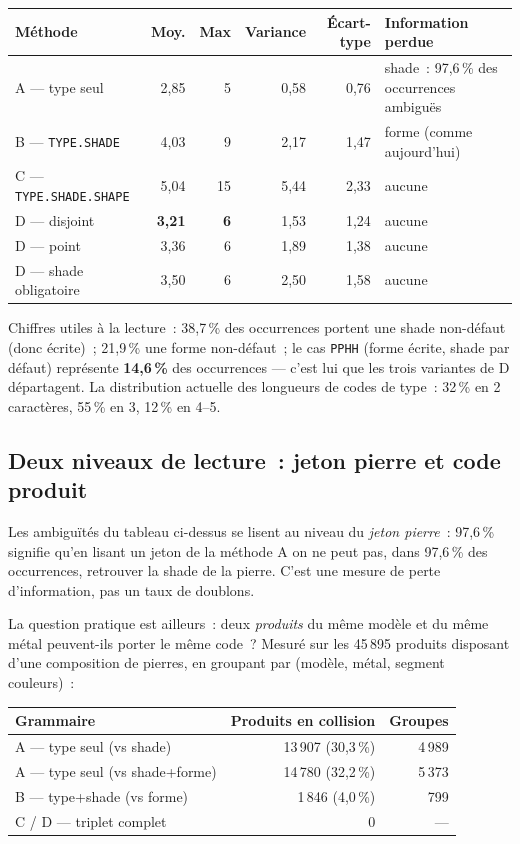 \documentclass[11pt,a4paper]{article}
\newcommand{\code}[1]{\texttt{#1}}
\begin{document}
\begin{center}
\begin{tabular}{l r r r r l}
\toprule
Méthode & Moy. & Max & Variance & Écart-type & Information perdue \\
\midrule
A — type seul            & 2,85 &  5 & 0,58 & 0,76 & shade~: 97,6\,\% des occurrences ambiguës \\
B — \code{TYPE.SHADE}    & 4,03 &  9 & 2,17 & 1,47 & forme (comme aujourd'hui) \\
C — \code{TYPE.SHADE.SHAPE} & 5,04 & 15 & 5,44 & 2,33 & aucune \\
D — disjoint             & \textbf{3,21} & \textbf{6} & 1,53 & 1,24 & aucune \\
D — point                & 3,36 &  6 & 1,89 & 1,38 & aucune \\
D — shade obligatoire    & 3,50 &  6 & 2,50 & 1,58 & aucune \\
\bottomrule
\end{tabular}
\end{center}

Chiffres utiles à la lecture~:
38,7\,\% des occurrences portent une shade non-défaut (donc écrite)~;
21,9\,\% une forme non-défaut~;
le cas \code{PPHH} (forme écrite, shade par défaut) représente
\textbf{14,6\,\%} des occurrences — c'est lui que les trois variantes de D
départagent. La distribution actuelle des longueurs de codes de type~:
32\,\% en 2 caractères, 55\,\% en 3, 12\,\% en 4--5.

\subsection{Deux niveaux de lecture~: jeton pierre et code produit}

Les ambiguïtés du tableau ci-dessus se lisent au niveau du \emph{jeton
pierre}~: 97,6\,\% signifie qu'en lisant un jeton de la méthode A on ne
peut pas, dans 97,6\,\% des occurrences, retrouver la shade de la pierre.
C'est une mesure de perte d'information, pas un taux de doublons.

La question pratique est ailleurs~: deux \emph{produits} du même modèle et
du même métal peuvent-ils porter le même code~? Mesuré sur les
45\,895 produits disposant d'une composition de pierres, en groupant par
(modèle, métal, segment couleurs)~:

\begin{center}
\begin{tabular}{l r r}
\toprule
Grammaire & Produits en collision & Groupes \\
\midrule
A — type seul (vs shade)         & 13\,907 (30,3\,\%) & 4\,989 \\
A — type seul (vs shade+forme)   & 14\,780 (32,2\,\%) & 5\,373 \\
B — type+shade (vs forme)        &  1\,846 (4,0\,\%)  &   799 \\
C / D — triplet complet          & 0 & — \\
\bottomrule
\end{tabular}
\end{center}
\end{document}
